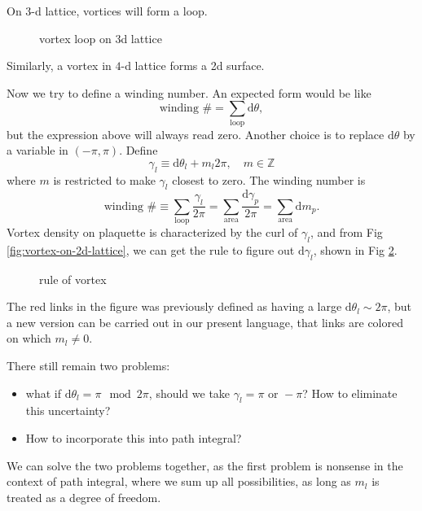 On $3$-d lattice, vortices will form a loop.
\begin{figure}[h!]
    \centering
    \caption{vortex loop on 3d lattice}
    \label{fig:vortex-loop-on-3d-lattice}
\end{figure}

Similarly, a vortex in $4$-d lattice forms a 2d surface.

Now we try to define a winding number. An expected form would be like
\begin{equation}
  \text{winding }\# = \sum_{\text{loop}} \mathrm{d} \theta,
\end{equation}
but the expression above will always read zero. Another choice is to replace $\mathrm{d} \theta$ by a variable in $(-\pi ,\pi )$. Define
\begin{equation}
  \gamma_{l} \equiv \mathrm{d} \theta_{l} + m_l 2\pi , \quad m \in \mathbb{Z}
\end{equation}
where $m$ is restricted to make $\gamma_{l}$ closest to zero. The winding number is
\begin{equation}
  \text{winding }\# \equiv \sum_{\text{loop}} \frac{\gamma_{l}}{2\pi } = \sum_{\text{area}} \frac{\mathrm{d} \gamma_{p}}{2\pi } = \sum_{\text{area}} \mathrm{d} m_{p}.
\end{equation}
Vortex density on plaquette is characterized by the curl of $\gamma_{l}$, and from Fig \ref{fig:vortex-on-2d-lattice}, we can get the rule to figure out $\mathrm{d} \gamma_{l}$, shown in Fig \ref{fig:rule-of-vortex}.
\begin{figure}[ht]
    \centering
    \caption{rule of vortex}
    \label{fig:rule-of-vortex}
\end{figure}
The red links in the figure was previously defined as having a large $\mathrm{d} \theta_{l} \sim 2\pi $, but a new version can be carried out in our present language, that links are colored on which $m_l \neq 0$.

There still remain two problems:
\begin{itemize}
  \item what if $\mathrm{d} \theta_{l} = \pi \mod 2\pi $, should we take $\gamma_{l} = \pi \text{ or } -\pi $? How to eliminate this uncertainty?
  \item How to incorporate this into path integral?
\end{itemize}
We can solve the two problems together, as the first problem is nonsense in the context of path integral, where we sum up all possibilities, as long as $m_l$ is treated as a degree of freedom.

